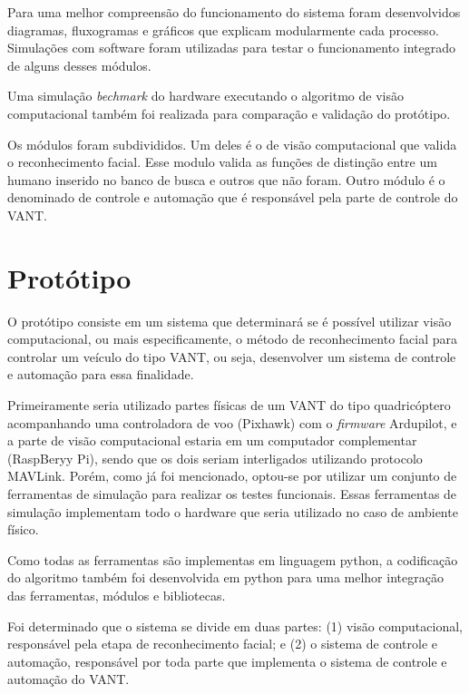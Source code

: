 
Para uma melhor compreensão do funcionamento do sistema foram desenvolvidos diagramas, fluxogramas e gráficos que explicam modularmente cada processo. Simulações com software foram utilizadas para testar o funcionamento integrado de alguns desses módulos. 

Uma simulação \textit{bechmark} do hardware executando o algoritmo de visão computacional também foi realizada para comparação e validação do protótipo.

Os módulos foram subdivididos. Um deles é o de visão computacional que valida o reconhecimento facial. Esse modulo valida as funções de distinção entre um humano inserido no banco de busca e outros que não foram. Outro módulo é o denominado de controle e automação que é responsável pela parte de controle do VANT.

\section{Protótipo}
O protótipo consiste em um sistema que determinará se é possível utilizar visão computacional, ou mais especificamente, o método de reconhecimento facial para controlar um veículo do tipo VANT, ou seja, desenvolver um sistema de controle e automação para essa finalidade.

Primeiramente seria utilizado partes físicas de um VANT do tipo quadricóptero acompanhando uma controladora de voo (Pixhawk) com o \textit{firmware} Ardupilot, e a parte de visão computacional estaria em um computador complementar (RaspBeryy Pi), sendo que os dois seriam interligados utilizando protocolo MAVLink. Porém, como já foi mencionado, optou-se por utilizar um conjunto de ferramentas de simulação para realizar os testes funcionais. Essas ferramentas de simulação implementam todo o hardware que seria utilizado no caso de ambiente físico. 

Como todas as ferramentas são implementas em linguagem python, a codificação do algoritmo também foi desenvolvida em python para uma melhor integração das ferramentas, módulos e bibliotecas.

Foi determinado que o sistema se divide em duas partes: (1) visão computacional, responsável pela etapa de reconhecimento facial; e (2) o sistema de controle e automação, responsável por toda parte que implementa o sistema de controle e automação do VANT.


